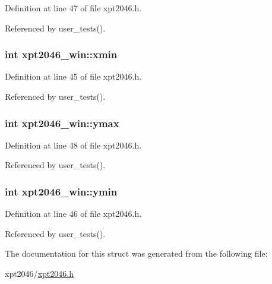 Definition at line 47 of file xpt2046.\+h.



Referenced by user\+\_\+tests().

\subsubsection[{\texorpdfstring{xmin}{xmin}}]{\setlength{\rightskip}{0pt plus 5cm}int xpt2046\+\_\+win\+::xmin}\hypertarget{structxpt2046__win_a83246592b12a936f334cea8f3374eafc}{}\label{structxpt2046__win_a83246592b12a936f334cea8f3374eafc}


Definition at line 45 of file xpt2046.\+h.



Referenced by user\+\_\+tests().

\subsubsection[{\texorpdfstring{ymax}{ymax}}]{\setlength{\rightskip}{0pt plus 5cm}int xpt2046\+\_\+win\+::ymax}\hypertarget{structxpt2046__win_ad5cfee0de6f30ce141b93b0aec904376}{}\label{structxpt2046__win_ad5cfee0de6f30ce141b93b0aec904376}


Definition at line 48 of file xpt2046.\+h.



Referenced by user\+\_\+tests().

\subsubsection[{\texorpdfstring{ymin}{ymin}}]{\setlength{\rightskip}{0pt plus 5cm}int xpt2046\+\_\+win\+::ymin}\hypertarget{structxpt2046__win_a8a6c2bee978d86317e06b8bb41a65d7c}{}\label{structxpt2046__win_a8a6c2bee978d86317e06b8bb41a65d7c}


Definition at line 46 of file xpt2046.\+h.



Referenced by user\+\_\+tests().



The documentation for this struct was generated from the following file\+:\begin{DoxyCompactItemize}
\item 
xpt2046/\hyperlink{xpt2046_8h}{xpt2046.\+h}\end{DoxyCompactItemize}
